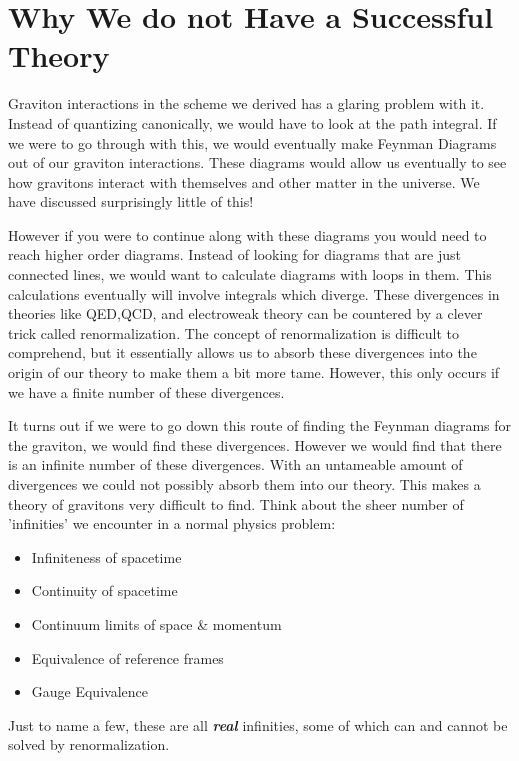 \documentclass[12pt]{article}
\begin{document}
\section{Why We do not Have a Successful Theory}
Graviton interactions in the scheme we derived has a glaring problem with it. Instead of quantizing canonically, we would have to look at the path integral. If we were to go through with this, we would eventually make Feynman Diagrams out of our graviton interactions. These diagrams would allow us eventually to see how gravitons interact with themselves and other matter in the universe. We have discussed surprisingly little of this!

However if you were to continue along with these diagrams you would need to reach higher order diagrams. Instead of looking for diagrams that are just connected lines, we would want to calculate diagrams with loops in them. This calculations eventually will involve integrals which diverge. These divergences in theories like QED,QCD, and electroweak theory can be countered by a clever trick called renormalization. The concept of renormalization is difficult to comprehend, but it essentially allows us to absorb these divergences into the origin of our theory to make them a bit more tame. However, this only occurs if we have a finite number of these divergences.

It turns out if we were to go down this route of finding the Feynman diagrams for the graviton, we would find these divergences. However we would find that there is an infinite number of these divergences. With an untameable amount of divergences we could not possibly absorb them into our theory. This makes a theory of gravitons very difficult to find. Think about the sheer number of 'infinities' we encounter in a normal physics problem:
\begin{itemize}
\item Infiniteness of spacetime
\item Continuity of spacetime
\item Continuum limits of space \& momentum
\item Equivalence of reference frames
\item Gauge Equivalence
\end{itemize}
Just to name a few, these are all \emph{\textbf{real}} infinities, some of which can and cannot be solved by renormalization.
\end{document}
